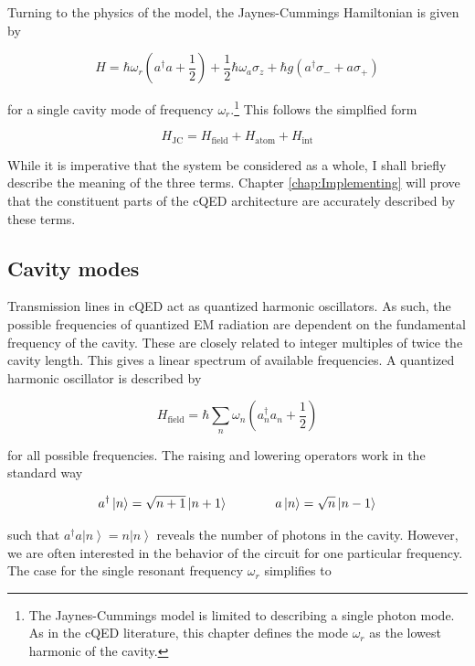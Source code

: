 \documentclass[12 pt]{book}
\newcommand{\ket}[1]{\left| #1 \right>} %
\begin{document}
Turning to the physics of the model, the Jaynes-Cummings Hamiltonian is given by

\begin{equation}\label{eq:JC}
H=\hbar \omega_r(a^\dag a + \frac{1}{2}) + \frac{1}{2}\hbar \omega_a \sigma_z + \hbar g(a^\dag \sigma_- + a\sigma_+)
\end{equation}

for a single cavity mode of frequency $\omega_r$.\footnote{The Jaynes-Cummings model is limited to describing a single photon mode. As in the cQED literature, this chapter defines the mode $\omega_r$ as the lowest harmonic of the cavity. } This follows the simplfied form

\begin{equation}
H_{\mathrm{JC}} = H_{\mathrm{field}}+H_{\mathrm{atom}}+H_{\mathrm{int}}
\end{equation}

While it is imperative that the system be considered as a whole, I shall briefly describe the meaning of the three terms. Chapter \ref{chap:Implementing} will prove that the constituent parts of the cQED architecture are accurately described by these terms. 

\subsection{Cavity modes}
Transmission lines in cQED act as quantized harmonic oscillators. As such, the possible frequencies of quantized EM radiation are dependent on the fundamental frequency of the cavity. These are closely related to integer multiples of twice the cavity length. This gives a linear spectrum of available frequencies. A quantized harmonic oscillator is described by 

\begin{equation}\label{eq:CavityHamiltonian}
H_{\mathrm{field}}=\hbar \sum_n\omega_n(a_n^\dag a_n+\frac{1}{2})
\end{equation}

for all possible frequencies. The raising and lowering operators work in the standard way

\begin{equation}
a^\dag\ket{n}=\sqrt{n+1}\ket{n+1} \hspace{1.3cm} a\ket{n}=\sqrt{n}\ket{n-1} 
\end{equation}

such that $a^\dag a\ket{n}=n\ket{n}$ reveals the number of photons in the cavity. However, we are often interested in the behavior of the circuit for one particular frequency. The case for the single resonant  frequency $\omega_r$ simplifies to 
\end{document}
